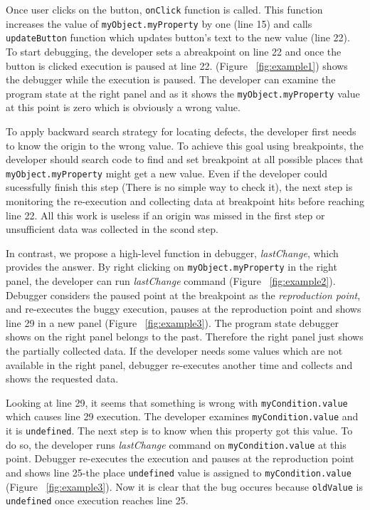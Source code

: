 \documentclass[preprint]{sigplanconf}
\begin{document}
Once user clicks on the button, \texttt{onClick} function is called. This function increases the value of \texttt{myObject.myProperty} by one (line 15) and calls \texttt{updateButton} function which updates button's text to the new value (line 22). To start debugging, the developer sets a abreakpoint on line 22 and once the button is clicked execution is paused at line 22. (Figure ~\ref{fig:example1}) shows the debugger while the execution is paused. The developer can examine the program state at the right panel and as it shows the \texttt{myObject.myProperty} value at this point is zero which is obviously a wrong value. 

To apply backward search strategy for locating defects, the developer first needs to know the origin to the wrong value. To achieve this goal using breakpoints, the developer should search code to find and set breakpoint at all possible places that \texttt{myObject.myProperty} might get a new value. Even if the developer could sucessfully finish this step (There is no simple way to check it), the next step is monitoring the re-execution and collecting data at breakpoint hits before reaching line 22. All this work is useless if an origin was missed in the first step or unsufficient data was collected in the scond step.

In contrast, we propose a high-level function in debugger, \textit{lastChange}, which provides the answer. By right clicking on \texttt{myObject.myProperty} in the right panel, the developer can run \textit{lastChange} command (Figure ~\ref{fig:example2}). Debugger considers the paused point at the breakpoint as the \textit{reproduction point}, and re-executes the buggy execution, pauses at the reproduction point and shows line 29 in a new panel (Figure ~\ref{fig:example3}). The program state debugger shows on the right panel belongs to the past. Therefore the right panel just shows the partially collected data. If the developer needs some values which are not available in the right panel, debugger re-executes another time and collects and shows the requested data. 

Looking at line 29, it seems that something is wrong with \texttt{myCondition.value} which causes line 29 execution. The developer examines \texttt{myCondition.value} and it is \texttt{undefined}. The next step is to know when this property got this value. To do so, the developer runs \textit{lastChange} command on \texttt{myCondition.value} at this point. Debugger re-executes the execution and pauses at the reproduction point and shows line 25-the place \texttt{undefined} value is assigned to \texttt{myCondition.value} (Figure ~\ref{fig:example3}). Now it is clear that the bug occures because \texttt{oldValue} is \texttt{undefined} once execution reaches line 25.
\end{document}

